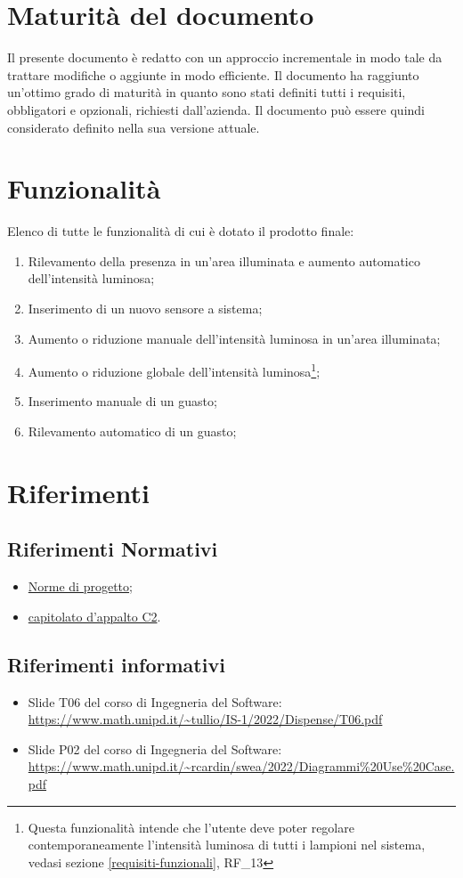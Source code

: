 \section{Maturità del documento}
Il presente documento è redatto con un approccio incrementale in modo tale da trattare modifiche o aggiunte in modo efficiente. Il documento ha raggiunto un'ottimo grado di maturità in quanto sono stati definiti tutti i requisiti, obbligatori e opzionali, richiesti dall'azienda. Il documento può essere quindi considerato definito nella sua versione attuale.

\section{Funzionalità}
Elenco di tutte le funzionalità di cui è dotato il prodotto finale:
\begin{enumerate}
    \item Rilevamento della presenza in un'area illuminata e aumento automatico dell'intensità luminosa;
    \item Inserimento di un nuovo sensore a sistema;
    \item Aumento o riduzione manuale dell'intensità luminosa in un'area illuminata;
    \item Aumento o riduzione globale dell'intensità luminosa\footnote{Questa funzionalità intende che l'utente deve poter regolare contemporaneamente l'intensità luminosa di tutti i lampioni nel sistema, vedasi sezione \ref{requisiti-funzionali}, RF\_13};
    \item Inserimento manuale di un guasto;
    \item Rilevamento automatico di un guasto;
\end{enumerate}

\section{Riferimenti}
\subsection{Riferimenti Normativi}
\begin{itemize}
    \item \href{https://github.com/SWEasabi/norme-di-progetto/releases}{Norme di progetto};
    \item \href{https://www.math.unipd.it/~tullio/IS-1/2022/Progetto/C2.pdf}{capitolato d'appalto C2}.
\end{itemize}

\subsection{Riferimenti informativi}
\begin{itemize}
    \item Slide T06 del corso di Ingegneria del Software: \\ \url{https://www.math.unipd.it/~tullio/IS-1/2022/Dispense/T06.pdf}
    \item Slide P02 del corso di Ingegneria del Software: \\ \url{https://www.math.unipd.it/~rcardin/swea/2022/Diagrammi%20Use%20Case.pdf}
\end{itemize}
